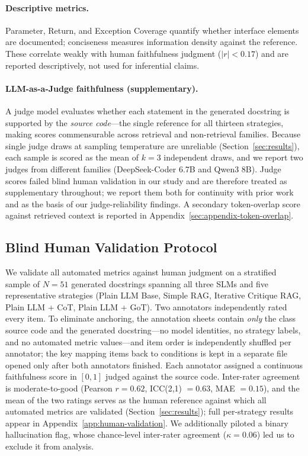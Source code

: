 \documentclass[pdflatex,sn-mathphys-ay]{sn-jnl}%
\theoremstyle{thmstyleone}%
\theoremstyle{thmstyletwo}%
\theoremstyle{thmstylethree}%
\begin{document}
\paragraph{Descriptive metrics.} Parameter, Return, and Exception Coverage quantify whether interface elements are documented; conciseness measures information density against the reference. These correlate weakly with human faithfulness judgment ($|r|<0.17$) and are reported descriptively, not used for inferential claims.
\paragraph{LLM-as-a-Judge faithfulness (supplementary).} A judge model evaluates whether each statement in the generated docstring is supported by the \emph{source code}---the single reference for all thirteen strategies, making scores commensurable across retrieval and non-retrieval families. Because single judge draws at sampling temperature are unreliable (Section~\ref{sec:results}), each sample is scored as the mean of $k{=}3$ independent draws, and we report two judges from different families (DeepSeek-Coder 6.7B and Qwen3 8B). Judge scores failed blind human validation in our study and are therefore treated as supplementary throughout; we report them both for continuity with prior work and as the basis of our judge-reliability findings. A secondary token-overlap score against retrieved context is reported in Appendix~\ref{sec:appendix-token-overlap}.

\subsection{Blind Human Validation Protocol}
\label{sec:human-validation}
We validate all automated metrics against human judgment on a stratified sample of $N{=}51$ generated docstrings spanning all three SLMs and five representative strategies (Plain LLM Base, Simple RAG, Iterative Critique RAG, Plain LLM + CoT, Plain LLM + GoT). Two annotators independently rated every item. To eliminate anchoring, the annotation sheets contain \emph{only} the class source code and the generated docstring---no model identities, no strategy labels, and no automated metric values---and item order is independently shuffled per annotator; the key mapping items back to conditions is kept in a separate file opened only after both annotators finished. Each annotator assigned a continuous faithfulness score in $[0,1]$ judged against the source code. Inter-rater agreement is moderate-to-good (Pearson $r=0.62$, ICC(2,1) $=0.63$, MAE $=0.15$), and the mean of the two ratings serves as the human reference against which all automated metrics are validated (Section~\ref{sec:results}); full per-strategy results appear in Appendix~\ref{app:human-validation}. We additionally piloted a binary hallucination flag, whose chance-level inter-rater agreement ($\kappa=0.06$) led us to exclude it from analysis.
\end{document}
